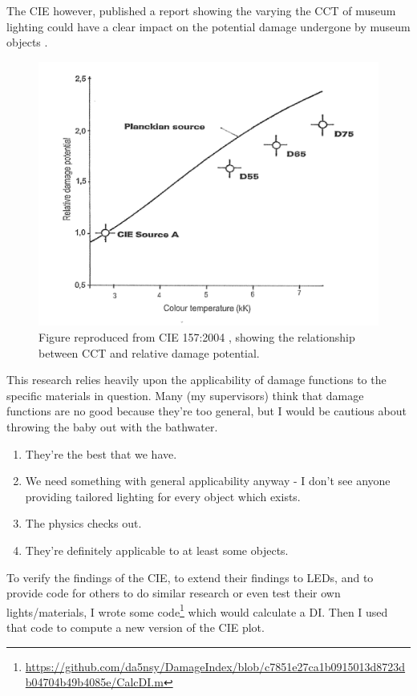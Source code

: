 The \gls{CIE} however, published a report showing the varying the \gls{CCT} of museum lighting could have a clear impact on the potential damage undergone by museum objects \citep{cie_cie_2004}. 

\begin{figure}[hbtp]
\includegraphics[max width=\textwidth]{figs/LitRev/CIE2004.png} 
\caption{Figure reproduced from CIE 157:2004 \citep[p.16]{cie_cie_2004}, showing the relationship between \gls{CCT} and relative damage potential.}
\label{fig:CIE2004}
\end{figure}

This research relies heavily upon the applicability of damage functions to the specific materials in question. Many (my supervisors) think that damage functions are no good because they're too general, but I would be cautious about throwing the baby out with the bathwater.

\begin{enumerate}
    \item They're the best that we have.
    \item We need something with general applicability anyway - I don't see anyone providing tailored lighting for every object which exists.
    \item The physics checks out.
    \item They're definitely applicable to at least some objects.
\end{enumerate}

To verify the findings of the \gls{CIE}, to extend their findings to \glspl{LED}, and to provide code for others to do similar research or even test their own lights/materials, I wrote some code\footnote{\url{https://github.com/da5nsy/DamageIndex/blob/c7851e27ca1b0915013d8723db04704b49b4085e/CalcDI.m}} which would calculate a \gls{DI}. Then I used that code to compute a new version of the \gls{CIE} plot.

